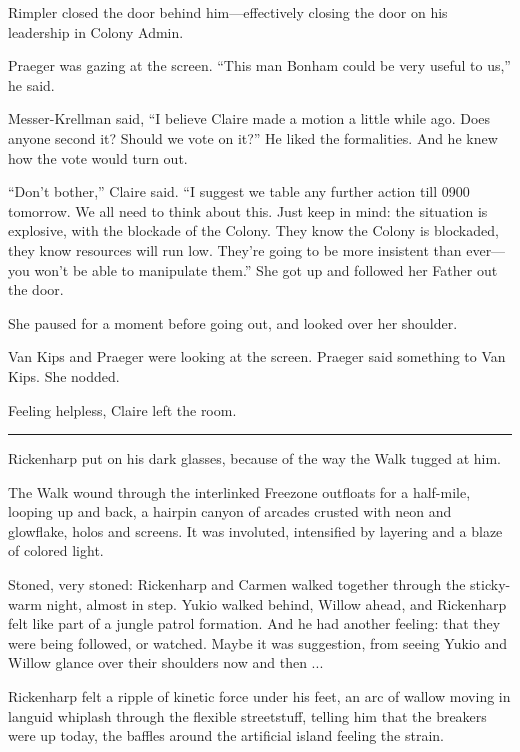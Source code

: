 Rimpler closed the door behind him—effectively closing the door on his leadership in Colony Admin.

Praeger was gazing at the screen. ``This man Bonham could be very useful to us,'' he said.

Messer-Krellman said, ``I believe Claire made a motion a little while ago. Does anyone second it? Should we vote on it?'' He liked the formalities. And he knew how the vote would turn out.

``Don't bother,'' Claire said. ``I suggest we table any further action till 0900 tomorrow. We all need to think about this. Just keep in mind: the situation is explosive, with the blockade of the Colony. They know the Colony is blockaded, they know resources will run low. They're going to be more insistent than ever—you won't be able to manipulate them.'' She got up and followed her Father out the door.

She paused for a moment before going out, and looked over her shoulder.

Van Kips and Praeger were looking at the screen. Praeger said something to Van Kips. She nodded.

Feeling helpless, Claire left the room.

\fancybreak{* * *}

Rickenharp put on his dark glasses, because of the way the Walk tugged at him.

The Walk wound through the interlinked Freezone outfloats for a half-mile, looping up and back, a hairpin canyon of arcades crusted with neon and glowflake, holos and screens. It was involuted, intensified by layering and a blaze of colored light.

Stoned, very stoned: Rickenharp and Carmen walked together through the sticky-warm night, almost in step. Yukio walked behind, Willow ahead, and Rickenharp felt like part of a jungle patrol formation. And he had another feeling: that they were being followed, or watched. Maybe it was suggestion, from seeing Yukio and Willow glance over their shoulders now and then ...

Rickenharp felt a ripple of kinetic force under his feet, an arc of wallow moving in languid whiplash through the flexible streetstuff, telling him that the breakers were up today, the baffles around the artificial island feeling the strain.

